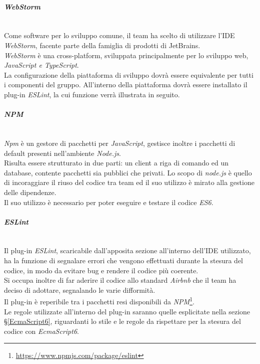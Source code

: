 \paragraph{\textit{WebStorm}}\-\\
Come software per lo sviluppo comune, il team ha scelto di utilizzare l'IDE \textit{WebStorm}, facente parte della famiglia di prodotti di JetBrains. \\
\textit{WebStorm} è una cross-platform, sviluppata principalmente per lo sviluppo web, \textit{JavaScript e TypeScript}. \\
La configurazione della piattaforma di sviluppo dovrà essere equivalente per tutti i componenti del gruppo. All'interno della piattaforma dovrà essere installato il plug-in \textit{ESLint}, la cui funzione verrà illustrata in seguito.

\paragraph{\textit{NPM}}\label{NPM} \-\\
\textit{Npm} è un gestore di pacchetti per \textit{JavaScript}, gestisce inoltre i pacchetti di default presenti nell'ambiente \textit{Node.js}\glossario.\\
Risulta essere strutturato in due parti: un client a riga di comando ed un database, contente pacchetti sia pubblici che privati. Lo scopo di \textit{node.js} è quello di incoraggiare il riuso del codice tra team ed il suo utilizzo è mirato alla gestione delle dipendenze.\\ 
Il suo utilizzo è necessario per poter eseguire e testare il codice \textit{ES6}.

\paragraph{\textit{ESLint}}\-\\
Il plug-in \textit{ESLint}, scaricabile dall'apposita sezione all'interno dell'IDE utilizzato, ha la funzione di segnalare errori che vengono effettuati durante la stesura del codice, in modo da evitare bug e rendere il codice più coerente. \\ 
Si occupa inoltre di far aderire il codice allo standard \textit{Airbnb} che il team ha deciso di adottare, segnalando le varie difformità.\\
Il plug-in è reperibile tra i pacchetti resi disponibili da \textit{NPM}\footnote{\url{https://www.npmjs.com/package/eslint}}.\\
Le regole utilizzate all'interno del plug-in saranno quelle esplicitate nella sezione §\ref{EcmaScript6}, riguardanti lo stile e le regole da rispettare per la stesura del codice con \textit{EcmaScript6}.

